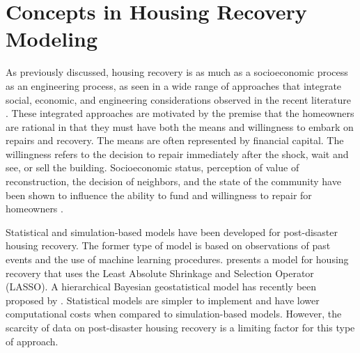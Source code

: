 \section{Concepts in Housing Recovery Modeling} 
As previously discussed, housing recovery is as much as a socioeconomic process as an engineering process, as seen in a wide range of approaches that integrate social, economic, and engineering considerations observed in the recent literature \citep{nejat2020spatially,moradi2020recovus,costa2020housing,bilau2018practice,hamideh2018housing,Burton2018,DESaster}. These integrated approaches are motivated by the premise that the homeowners are rational in that they must have both the means and willingness to embark on repairs and recovery. The means are often represented by financial capital. The willingness refers to the decision to repair immediately after the shock, wait and see, or sell the building. Socioeconomic status, perception of value of reconstruction, the decision of neighbors, and the state of the community have been shown to influence the ability to fund and willingness to repair for homeowners \citep{Burton2018, moradi2020recovus, nejat2012agent,comerio2006estimating,chang2011identifying,boiser2011skills,bilau2015framework,hwang2015postdisaster,bothara2016challenges}. \ 

Statistical and simulation-based models have been developed for post-disaster housing recovery. The former type of model is based on observations of past events and the use of machine learning procedures. \cite{nejat2012agent} presents a model for housing recovery that uses the Least Absolute Shrinkage and Selection Operator (LASSO). A hierarchical Bayesian geostatistical model has recently been proposed by \cite{nejat2020spatially}. Statistical models are simpler to implement and have lower computational costs when compared to simulation-based models. However, the scarcity of data on post-disaster housing recovery is a limiting factor for this type of approach.\ 

